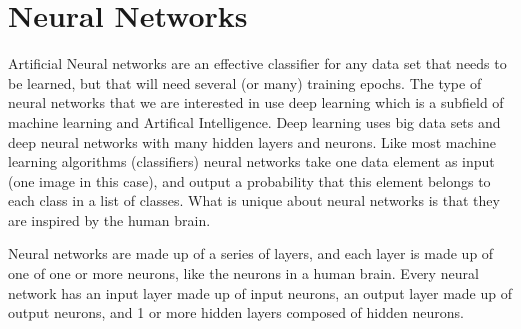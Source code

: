 \documentclass[12pt]{report} %
\begin{document}
\chapter{Neural Networks}
	
	Artificial Neural networks are an effective classifier for any data set that needs to be learned, but that will need several (or many) training epochs. The type of neural networks that we are interested in use deep learning which is a subfield of machine learning and Artifical Intelligence. Deep learning uses big data sets and deep neural networks with many hidden layers and neurons\cite{deepMachineMastry}. Like most machine learning algorithms (classifiers)  neural networks take one data element as input (one image in this case), and output a probability that this element belongs to each class in a list of classes. What is unique about neural networks is that they are inspired by the human brain. 
	
	Neural networks are made up of a series of layers, and each layer is made up of one of one or more neurons, like the neurons in a human brain. Every neural network has an input layer made up of input neurons, an output layer made up of output neurons, and 1 or more hidden layers composed of hidden neurons.
\end{document}
